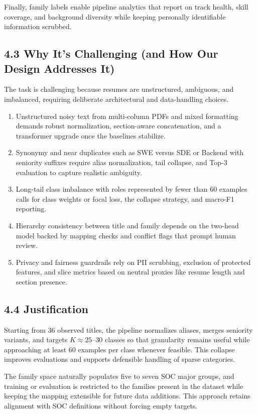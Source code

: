 \documentclass[12pt]{article}
\begin{document}
Finally, family labels enable pipeline analytics that report on track health, skill coverage, and background diversity while keeping personally identifiable information scrubbed.

\medskip

\subsection*{4.3 Why It’s Challenging (and How Our Design Addresses It)}
The task is challenging because resumes are unstructured, ambiguous, and imbalanced, requiring deliberate architectural and data-handling choices.
\begin{enumerate}
  \item Unstructured noisy text from multi-column PDFs and mixed formatting demands robust normalization, section-aware concatenation, and a transformer upgrade once the baselines stabilize.
  \item Synonymy and near duplicates such as SWE versus SDE or Backend with seniority suffixes require alias normalization, tail collapse, and Top-3 evaluation to capture realistic ambiguity.
  \item Long-tail class imbalance with roles represented by fewer than 60 examples calls for class weights or focal loss, the collapse strategy, and macro-F1 reporting.
  \item Hierarchy consistency between title and family depends on the two-head model backed by mapping checks and conflict flags that prompt human review.
  \item Privacy and fairness guardrails rely on PII scrubbing, exclusion of protected features, and slice metrics based on neutral proxies like resume length and section presence.
\end{enumerate}

\medskip

\subsection*{4.4 Justification}
Starting from 36 observed titles, the pipeline normalizes aliases, merges seniority variants, and targets $K\approx25$--$30$ classes so that granularity remains useful while approaching at least 60 examples per class whenever feasible. This collapse improves evaluations and supports defensible handling of sparse categories.

\medskip

The family space naturally populates five to seven SOC major groups, and training or evaluation is restricted to the families present in the dataset while keeping the mapping extensible for future data additions. This approach retains alignment with SOC definitions without forcing empty targets.
\end{document}
